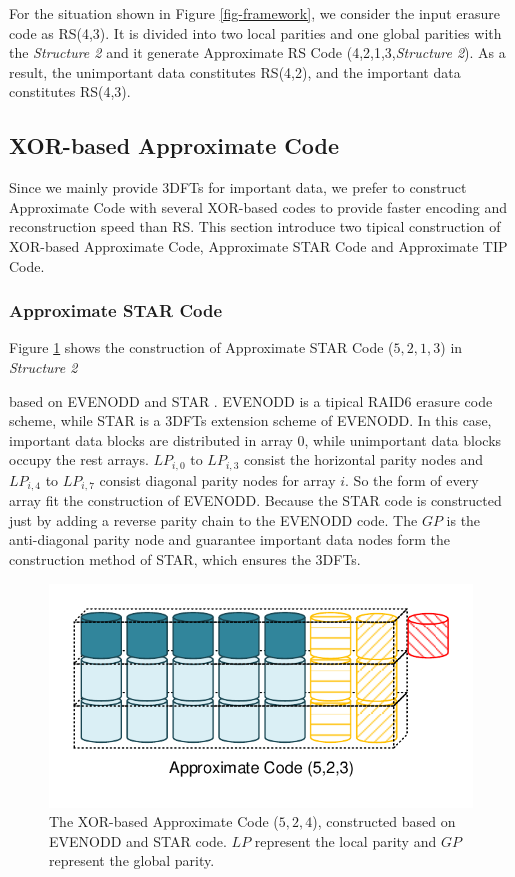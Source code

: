 \documentclass[sigconf]{acmart}
\begin{document}
For the situation shown in Figure \ref{fig-framework}, we consider the input erasure code as RS(4,3). It is divided into two local parities and one global parities with the \emph{Structure 2} and it generate Approximate RS Code (4,2,1,3,\emph{Structure 2}).
As a result, the unimportant data constitutes RS(4,2), and the important data constitutes RS(4,3).


\subsection{XOR-based Approximate Code}
Since we mainly provide 3DFTs for important data, we prefer to construct Approximate Code with several XOR-based codes to provide faster encoding and reconstruction speed than RS. This section introduce two tipical construction of XOR-based Approximate Code, Approximate STAR Code and Approximate TIP Code.

\subsubsection{Approximate STAR Code}
Figure \ref{fig-ap-STAR} shows the construction of Approximate STAR Code ($5,2,1,3$) in \emph{Structure 2}

based on EVENODD \cite{blaum1995evenodd} and STAR \cite{huang2008star}. 
EVENODD is a tipical RAID6 erasure code scheme, while STAR is a 3DFTs extension scheme of EVENODD. In this case, important data blocks are distributed in array 0, while unimportant data blocks occupy the rest arrays. 
$LP_{i,0}$ to $LP_{i,3}$ consist the horizontal parity nodes and $LP_{i,4}$ to $LP_{i,7}$ consist diagonal parity nodes for array $i$. So the form of every array fit the construction of EVENODD. Because the STAR code is constructed just by adding a reverse parity chain to the EVENODD code. 
The $GP$ is the anti-diagonal parity node and guarantee important data nodes form the construction method of STAR, which ensures the 3DFTs.

\begin{figure}[]
\centering
\includegraphics[width=0.6\linewidth]{photo/AP-523.pdf}
\caption{The XOR-based Approximate Code ($5,2,4$), constructed based on EVENODD and STAR code. $LP$ represent the local parity and $GP$ represent the global parity.}
\label{fig-ap-STAR}
\end{figure}
\end{document}
